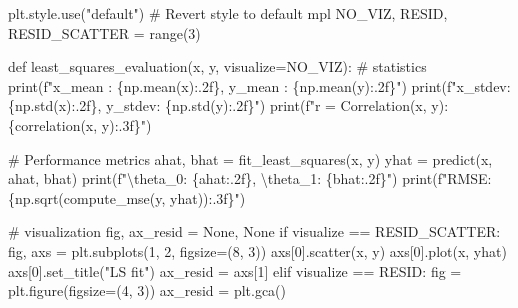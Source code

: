 \documentclass[
  letterpaper,
  DIV=11,
  numbers=noendperiod]{scrreprt}
\newenvironment{Shaded}{\begin{snugshade}}{\end{snugshade}}
\newcommand{\BuiltInTok}[1]{\textcolor[rgb]{0.00,0.23,0.31}{#1}}
\newcommand{\CharTok}[1]{\textcolor[rgb]{0.13,0.47,0.30}{#1}}
\newcommand{\CommentTok}[1]{\textcolor[rgb]{0.37,0.37,0.37}{#1}}
\newcommand{\ControlFlowTok}[1]{\textcolor[rgb]{0.00,0.23,0.31}{#1}}
\newcommand{\DecValTok}[1]{\textcolor[rgb]{0.68,0.00,0.00}{#1}}
\newcommand{\KeywordTok}[1]{\textcolor[rgb]{0.00,0.23,0.31}{#1}}
\newcommand{\NormalTok}[1]{\textcolor[rgb]{0.00,0.23,0.31}{#1}}
\newcommand{\OperatorTok}[1]{\textcolor[rgb]{0.37,0.37,0.37}{#1}}
\newcommand{\SpecialCharTok}[1]{\textcolor[rgb]{0.37,0.37,0.37}{#1}}
\newcommand{\SpecialStringTok}[1]{\textcolor[rgb]{0.13,0.47,0.30}{#1}}
\newcommand{\StringTok}[1]{\textcolor[rgb]{0.13,0.47,0.30}{#1}}
\newcommand{\VariableTok}[1]{\textcolor[rgb]{0.07,0.07,0.07}{#1}}
\begin{document}
\begin{Shaded}
\begin{Highlighting}[]
\NormalTok{plt.style.use(}\StringTok{"default"}\NormalTok{)  }\CommentTok{\# Revert style to default mpl}
\NormalTok{NO\_VIZ, RESID, RESID\_SCATTER }\OperatorTok{=} \BuiltInTok{range}\NormalTok{(}\DecValTok{3}\NormalTok{)}


\KeywordTok{def}\NormalTok{ least\_squares\_evaluation(x, y, visualize}\OperatorTok{=}\NormalTok{NO\_VIZ):}
    \CommentTok{\# statistics}
    \BuiltInTok{print}\NormalTok{(}\SpecialStringTok{f"x\_mean : }\SpecialCharTok{\{}\NormalTok{np}\SpecialCharTok{.}\NormalTok{mean(x)}\SpecialCharTok{:.2f\}}\SpecialStringTok{, y\_mean : }\SpecialCharTok{\{}\NormalTok{np}\SpecialCharTok{.}\NormalTok{mean(y)}\SpecialCharTok{:.2f\}}\SpecialStringTok{"}\NormalTok{)}
    \BuiltInTok{print}\NormalTok{(}\SpecialStringTok{f"x\_stdev: }\SpecialCharTok{\{}\NormalTok{np}\SpecialCharTok{.}\NormalTok{std(x)}\SpecialCharTok{:.2f\}}\SpecialStringTok{, y\_stdev: }\SpecialCharTok{\{}\NormalTok{np}\SpecialCharTok{.}\NormalTok{std(y)}\SpecialCharTok{:.2f\}}\SpecialStringTok{"}\NormalTok{)}
    \BuiltInTok{print}\NormalTok{(}\SpecialStringTok{f"r = Correlation(x, y): }\SpecialCharTok{\{}\NormalTok{correlation(x, y)}\SpecialCharTok{:.3f\}}\SpecialStringTok{"}\NormalTok{)}

    \CommentTok{\# Performance metrics}
\NormalTok{    ahat, bhat }\OperatorTok{=}\NormalTok{ fit\_least\_squares(x, y)}
\NormalTok{    yhat }\OperatorTok{=}\NormalTok{ predict(x, ahat, bhat)}
    \BuiltInTok{print}\NormalTok{(}\SpecialStringTok{f"}\CharTok{\textbackslash{}t}\SpecialStringTok{heta\_0: }\SpecialCharTok{\{}\NormalTok{ahat}\SpecialCharTok{:.2f\}}\SpecialStringTok{, }\CharTok{\textbackslash{}t}\SpecialStringTok{heta\_1: }\SpecialCharTok{\{}\NormalTok{bhat}\SpecialCharTok{:.2f\}}\SpecialStringTok{"}\NormalTok{)}
    \BuiltInTok{print}\NormalTok{(}\SpecialStringTok{f"RMSE: }\SpecialCharTok{\{}\NormalTok{np}\SpecialCharTok{.}\NormalTok{sqrt(compute\_mse(y, yhat))}\SpecialCharTok{:.3f\}}\SpecialStringTok{"}\NormalTok{)}

    \CommentTok{\# visualization}
\NormalTok{    fig, ax\_resid }\OperatorTok{=} \VariableTok{None}\NormalTok{, }\VariableTok{None}
    \ControlFlowTok{if}\NormalTok{ visualize }\OperatorTok{==}\NormalTok{ RESID\_SCATTER:}
\NormalTok{        fig, axs }\OperatorTok{=}\NormalTok{ plt.subplots(}\DecValTok{1}\NormalTok{, }\DecValTok{2}\NormalTok{, figsize}\OperatorTok{=}\NormalTok{(}\DecValTok{8}\NormalTok{, }\DecValTok{3}\NormalTok{))}
\NormalTok{        axs[}\DecValTok{0}\NormalTok{].scatter(x, y)}
\NormalTok{        axs[}\DecValTok{0}\NormalTok{].plot(x, yhat)}
\NormalTok{        axs[}\DecValTok{0}\NormalTok{].set\_title(}\StringTok{"LS fit"}\NormalTok{)}
\NormalTok{        ax\_resid }\OperatorTok{=}\NormalTok{ axs[}\DecValTok{1}\NormalTok{]}
    \ControlFlowTok{elif}\NormalTok{ visualize }\OperatorTok{==}\NormalTok{ RESID:}
\NormalTok{        fig }\OperatorTok{=}\NormalTok{ plt.figure(figsize}\OperatorTok{=}\NormalTok{(}\DecValTok{4}\NormalTok{, }\DecValTok{3}\NormalTok{))}
\NormalTok{        ax\_resid }\OperatorTok{=}\NormalTok{ plt.gca()}


\end{Highlighting}
\end{Shaded}
\end{document}
